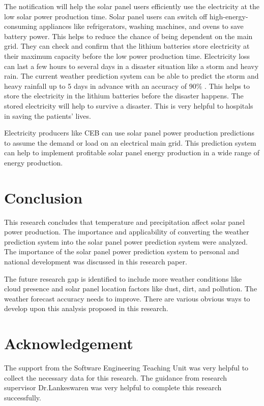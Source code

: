 \documentclass[conference]{IEEEtran}
\begin{document}
The notification will help the solar panel users efficiently use the electricity at the low solar power production time. Solar panel users can switch off high-energy-consuming appliances like refrigerators, washing machines, and ovens to save battery power. This helps to reduce the chance of being dependent on the main grid. They can check and confirm that the lithium batteries store electricity at their maximum capacity before the low power production time. Electricity loss can last a few hours to several days in a disaster situation like a storm and heavy rain. The current weather prediction system can be able to predict the storm and heavy rainfall up to 5 days in advance with an accuracy of 90\% \cite{accuracy}. This helps to store the electricity in the lithium batteries before the disaster happens. The stored electricity will help to survive a disaster. This is very helpful to hospitals in saving the patients' lives. 

Electricity producers like CEB can use solar panel power production predictions to assume the demand or load on an electrical main grid. This prediction system can help to implement profitable solar panel energy production in a wide range of energy production.


\section{Conclusion}
This research concludes that temperature and precipitation affect solar panel power production.  The importance and applicability of converting the weather prediction system into the solar panel power prediction system were analyzed. The importance of the solar panel power prediction system to personal and national development was discussed in this research paper.

The future research gap is identified to include more weather conditions like cloud presence and solar panel location factors like dust, dirt, and pollution. The weather forecast accuracy needs to improve. There are various obvious ways to develop upon this analysis proposed in this research.

\section{Acknowledgement}
The support from the Software Engineering Teaching Unit was very helpful to collect the necessary data for this research. The guidance from research supervisor Dr.Lankeswaren was very helpful to complete this research successfully.




\end{document}
